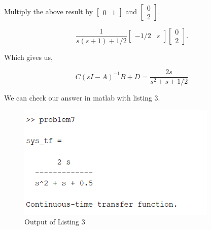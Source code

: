 \documentclass[12pt]{article}
\numberwithin{equation}{section}
\begin{document}
  Multiply the above result by $ \begin{bmatrix} 0 & 1 \end{bmatrix} $ and $ \begin{bmatrix} 0 \\ 2\end{bmatrix}. $


  \[
      \frac{1}{s(s + 1) + 1/2}
      \begin{bmatrix}
        -1/2 & s
      \end{bmatrix}
      \begin{bmatrix}
        0 \\ 2
      \end{bmatrix}
    .\]

  Which gives us,

  \begin{equation}
    C \left( sI - A \right)^{-1}B + D = \frac{2s}{s^2 + s + 1/2}
  \end{equation}

  We can check our answer in matlab with listing 3.

  \newpage

  

  \begin{figure}
    \centering
    \includegraphics[width = 0.85\textwidth]{figures/problem7output}
    \caption{Output of Listing 3}
    \label{fig:problem7}
  \end{figure}
\end{document}
